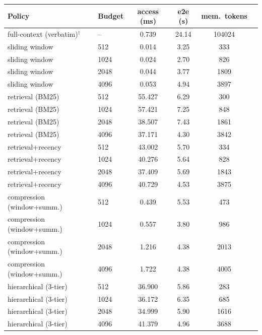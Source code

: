 \begin{tabular}{llcccc}
\toprule
Policy & Budget & access (ms) & e2e (s) & mem.\ tokens \\
\midrule
full-context (verbatim)$^{\dagger}$ & -- & 0.739 & 24.14 & 104024 \\
sliding window & 512 & 0.014 & 3.25 & 333 \\
sliding window & 1024 & 0.024 & 2.70 & 826 \\
sliding window & 2048 & 0.044 & 3.77 & 1809 \\
sliding window & 4096 & 0.053 & 4.94 & 3897 \\
retrieval (BM25) & 512 & 55.427 & 6.29 & 300 \\
retrieval (BM25) & 1024 & 57.421 & 7.25 & 848 \\
retrieval (BM25) & 2048 & 38.507 & 7.43 & 1861 \\
retrieval (BM25) & 4096 & 37.171 & 4.30 & 3842 \\
retrieval+recency & 512 & 43.002 & 5.70 & 334 \\
retrieval+recency & 1024 & 40.276 & 5.64 & 828 \\
retrieval+recency & 2048 & 37.409 & 5.69 & 1843 \\
retrieval+recency & 4096 & 40.729 & 4.53 & 3875 \\
compression (window+summ.) & 512 & 0.439 & 5.53 & 473 \\
compression (window+summ.) & 1024 & 0.557 & 3.80 & 986 \\
compression (window+summ.) & 2048 & 1.216 & 4.38 & 2013 \\
compression (window+summ.) & 4096 & 1.722 & 4.38 & 4005 \\
hierarchical (3-tier) & 512 & 36.900 & 5.86 & 283 \\
hierarchical (3-tier) & 1024 & 36.172 & 6.35 & 685 \\
hierarchical (3-tier) & 2048 & 34.999 & 5.90 & 1616 \\
hierarchical (3-tier) & 4096 & 41.379 & 4.96 & 3688 \\
\bottomrule
\end{tabular}